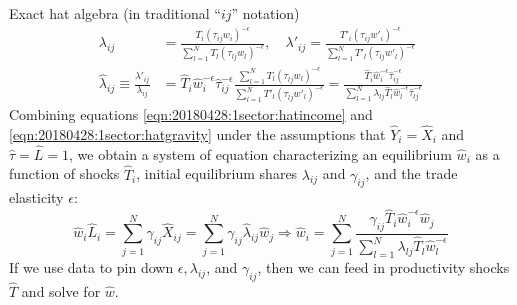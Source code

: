 \documentclass[10pt,notes=hide]{beamer}
\begin{document}
\begin{frame}{Exact hat algebra (in traditional ``$ij$'' notation)}
\begin{align}
\lambda_{ij} 
&=
\frac{T_{i} \left(\tau_{ij}w_i\right)^{-\epsilon}}{\sum_{l=1}^{N} T_{l}  \left(\tau_{lj}w_l\right)^{-\epsilon}},
\quad
\lambda'_{ij} 
=
\frac{T'_{i} \left(\tau_{ij}w'_i\right)^{-\epsilon}}{\sum_{l=1}^{N} T'_{l}  \left(\tau_{lj}w'_l\right)^{-\epsilon}}
\nonumber \\
\hat{\lambda}_{ij}
\equiv 
\frac{\lambda'_{ij}}{\lambda_{ij}}
&=
\hat{T}_{i} \hat{w}_{i}^{-\epsilon} \hat{\tau}_{ij}^{-\epsilon}
\frac{\sum_{l=1}^{N} T_{l}  \left(\tau_{lj}w_l \right)^{-\epsilon}}
	 {\sum_{l=1}^{N} T'_{l} \left(\tau_{lj}w'_l\right)^{-\epsilon}}
=
\frac{\hat{T}_{i} \hat{w}_{i}^{-\epsilon}\hat{\tau}_{ij}^{-\epsilon}}{\sum_{l=1}^{N} \lambda_{lj} \hat{T}_{l} \hat{w}_l^{-\epsilon} \hat{\tau}_{lj}^{-\epsilon}}
\label{eqn:20180428:1sector:hatgravity}
\end{align}
Combining equations \eqref{eqn:20180428:1sector:hatincome} and \eqref{eqn:20180428:1sector:hatgravity}
under the assumptions that $\hat{Y}_{i}=\hat{X}_{i}$ and $\hat{\tau}=\hat{L}=1$, we
obtain a system of equation characterizing an equilibrium $\hat{w}_i$ as a
function of shocks $\hat{T}_i$, initial equilibrium shares $\lambda_{ij}$ and
$\gamma_{ij}$, and the trade elasticity $\epsilon$:
\begin{equation}
\hat{w}_i \hat{L}_i
= 
\sum_{j=1}^{N} \gamma_{ij} \hat{X}_{ij}
=
\sum_{j=1}^{N} \gamma_{ij} \hat{\lambda}_{ij} \hat{w}_{j}
\nonumber 
\Rightarrow
\hat{w}_i
= 
\sum_{j=1}^{N}
\frac{\gamma_{ij} \hat{T}_{i} \hat{w}_{i}^{-\epsilon} \hat{w}_{j} }
{\sum_{l=1}^{N} \lambda_{lj} \hat{T}_{l} \hat{w}_l^{-\epsilon}}
\label{eqn:20180428:1sector:hatequilibriumequations}
\end{equation}
If we use data to pin down $\epsilon, \lambda_{ij}$, and $\gamma_{ij}$, then
we can feed in productivity shocks $\hat{T}$ and solve for $\hat{w}$.
\end{frame}
\end{document}
